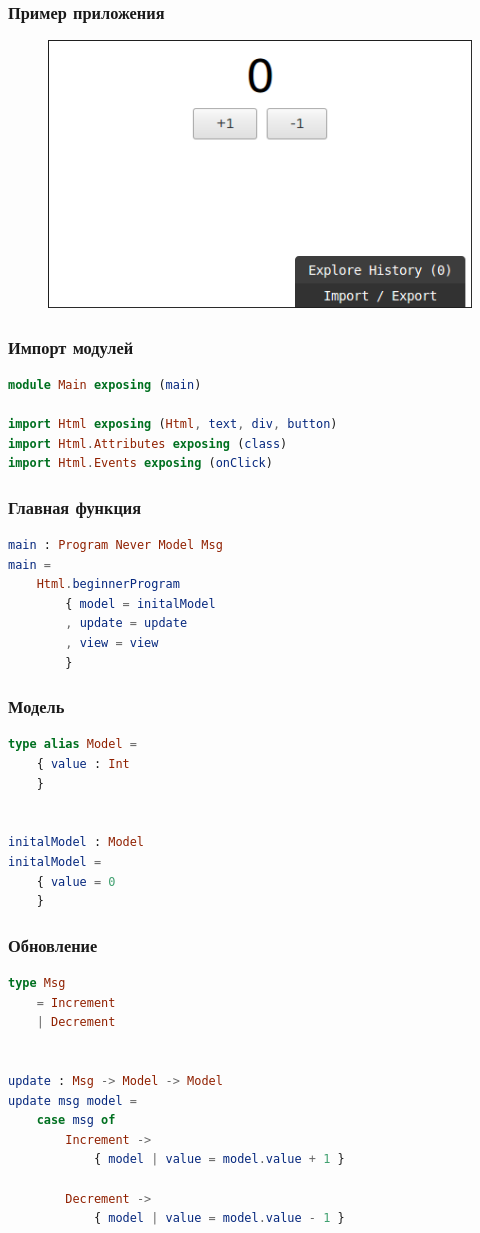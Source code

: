 \documentclass[11pt,aspectratio=169]{beamer}
\begin{document}
\begin{frame}
\frametitle{Пример приложения}
\begin{figure}
	\includegraphics[scale=0.5]{elm-app-sample}
\end{figure}
\end{frame}

\begin{frame}[fragile]
\frametitle{Импорт модулей}
\begin{lstlisting}[language=elm]
module Main exposing (main)

import Html exposing (Html, text, div, button)
import Html.Attributes exposing (class)
import Html.Events exposing (onClick)
\end{lstlisting}
\end{frame}

\begin{frame}[fragile]
\frametitle{Главная функция}
\begin{lstlisting}[language=elm]
main : Program Never Model Msg
main =
    Html.beginnerProgram
        { model = initalModel
        , update = update
        , view = view
        }
\end{lstlisting}
\end{frame}

\begin{frame}[fragile]
\frametitle{Модель}
\begin{lstlisting}[language=elm]
type alias Model =
    { value : Int
    }


initalModel : Model
initalModel =
    { value = 0
    }
\end{lstlisting}
\end{frame}

\begin{frame}[fragile]
\frametitle{Обновление}
\begin{lstlisting}[language=elm]
type Msg
    = Increment
    | Decrement


update : Msg -> Model -> Model
update msg model =
    case msg of
        Increment ->
            { model | value = model.value + 1 }

        Decrement ->
            { model | value = model.value - 1 }
\end{lstlisting}
\end{frame}
\end{document}
